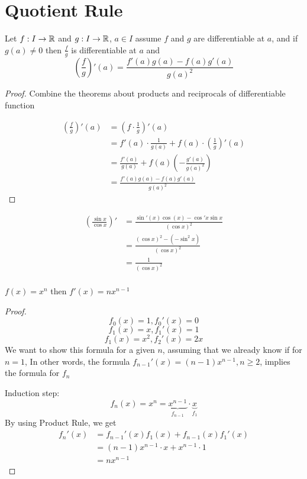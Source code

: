 \section{Quotient Rule}
\begin{theorem*}
  Let $f: I \to \mathbb R$ and $g: I \to \mathbb R$, $a\in I$ assume $f$ and $g$ are differentiable at $a$, and if $g(a) \neq 0$
  then $\frac{f}{g}$ is differentiable at $a$ and $$\left(\frac{f}{g}\right)'(a) = \frac{f'(a)g(a) - f(a)g'(a)}{g(a)^2}$$
\end{theorem*}
\begin{proof}
  Combine the theorems about products and reciprocals of differentiable function

  \begin{align*}
  \left(\frac{f}{g}\right)'(a) &= \left(f \cdot \frac{1}{g}\right)'(a) \\
  &= f'(a) \cdot \frac{1}{g(a)} + f(a) \cdot \left(\frac{1}{g}\right)'(a) \\
  &= \frac{f'(a)}{g(a)} + f(a)\left(-\frac{g'(a)}{g(a)^2}\right) \\
  &= \frac{f'(a)g(a) - f(a)g'(a)}{g(a)^2}
  \end{align*}
\end{proof}

\begin{example*}
  \begin{align*}
    \left(\frac{\sin x}{\cos x}\right)' &= \frac{\sin'(x) \cos(x) - \cos' x \sin x}{(\cos x)^2} \\
    &= \frac{(\cos x)^2 - (-\sin ^2 x)}{(\cos x)^2} \\
    &= \frac{1}{(\cos x)^2} \\
  \end{align*}
\end{example*}

\begin{example*}
  $f(x) = x^n$ then
  $f'(x) = n x^{n-1}$
\end{example*}
\begin{proof}
  $$f_0(x) = 1, f_0'(x) = 0$$
  $$f_1(x) = x, f_1'(x) = 1$$
  $$f_1(x) = x^2, f_2'(x) = 2x$$
  We want to show this formula for a given $n$, assuming that we already know if for $n = 1$,
  In other words, the formula $f_{n-1}'(x) = (n-1)x^{n-1}, n \geq 2$,
  implies the formula for $f_n$

  Induction step: $$f_n(x) = x^n = \underbrace{x^{n-1}}_{f_{n-1}} \cdot \underbrace{x}_{f_1}$$
  By using Product Rule, we get
  \begin{align*}
  f_n'(x) &= f_{n-1}'(x)f_1(x) + f_{n-1}(x)f_1'(x) \\
  &= (n-1)x^{n-1} \cdot x + x^{n-1} \cdot 1 \\
  &= nx^{n-1} 
  \end{align*}
\end{proof}

